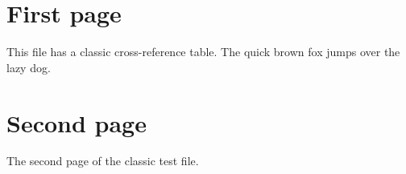 \documentclass[a4paper]{article}
\begin{document}
\section{First page}
This file has a classic cross-reference table. The quick brown fox jumps over the lazy dog.
\newpage
\section{Second page}
The second page of the classic test file.
\end{document}
